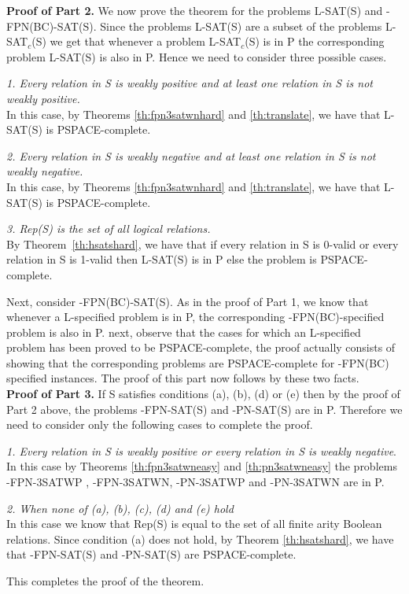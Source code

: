 \noindent
{\bf Proof of Part 2.}
We now prove the theorem for the problems {\sf L-SAT(S)} and
{-FPN(BC)-SAT(S)}.  Since the problems
{\sf L-SAT(S)} are a subset of the problems {\sf L-SAT$_c$(S)} 
we get that whenever a problem {\sf L-SAT$_c$(S)} is  in 
P the corresponding problem {\sf L-SAT(S)} is also
in {\sf P}. Hence we need to consider three possible cases.

\noindent
{\em 1.  Every relation in {\sf S} is weakly positive and at least one relation
in {\sf S} is not weakly positive.}\\
In this case, by Theorems \ref{th:fpn3satwnhard} and \ref{th:translate}, 
we have that {\sf L-SAT(S)} is {\sf PSPACE}-complete.

\noindent
{\em 2. Every relation in {\sf S} is weakly negative and at least one relation
in {\sf S} is not weakly negative.}\\
In this case, by Theorems \ref{th:fpn3satwnhard} and \ref{th:translate}, 
we have that {\sf L-SAT(S)} is
{\sf PSPACE}-complete.

\noindent
{\em  3. {\sf Rep(S)}  is the set of all logical relations.}\\
By Theorem~\ref{th:hsatshard}, we have that if 
every relation in {\sf S} is 0-valid or every relation 
in {\sf S} is 1-valid then {\sf L-SAT(S)} is in {\sf P}
else the problem is {\sf PSPACE}-complete.



Next, consider {-FPN(BC)-SAT(S)}. 
As in the proof of Part 1, we know that whenever a {\sf L}-specified
problem is in {\sf P}, 
the corresponding {-FPN(BC)}-specified problem is also in {\sf P}.
next, observe that the cases for which an {\sf L}-specified problem has been
proved to be {\sf PSPACE}-complete, the proof actually consists of showing that
the corresponding problems are {\sf PSPACE}-complete for {-FPN(BC)} 
specified instances. The proof of this part now follows by these two facts.\\


\noindent
{\bf Proof of Part 3.}
If {\sf S} satisfies conditions (a), (b), (d) or (e) then 
by the proof of Part 2 above, the problems
{-FPN-SAT(S)} and {-PN-SAT(S)} are in {\sf P}. 
Therefore we need to consider only the following cases to complete the proof.


\noindent
{\em 1. Every relation in {\sf S} is weakly positive or every relation in
{\sf S} is weakly negative}.\\
In this case by Theorems \ref{th:fpn3satwneasy} and \ref{th:pn3satwneasy}
the problems {-FPN-3SATWP} , {-FPN-3SATWN}, {-PN-3SATWP}  and
{-PN-3SATWN}  are in {\sf P}.

\noindent
{\em 2. When none of (a), (b), (c), (d) and (e) hold}\\
In this case we know that {\sf Rep(S)} is equal to the set
of all finite arity Boolean relations. Since condition (a) does not hold,
by Theorem \ref{th:hsatshard}, we have that 
{-FPN-SAT(S)} and {-PN-SAT(S)} are {\sf PSPACE}-complete.

This completes the proof of the theorem. \hfill\QED
\fi
